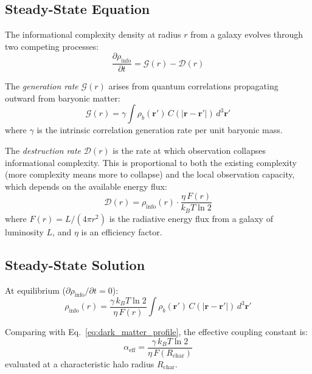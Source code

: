 \documentclass[12pt,a4paper]{article}
\begin{document}
\subsection{Steady-State Equation}

The informational complexity density at radius $r$ from a galaxy evolves through two competing processes:
\begin{equation}
    \frac{\partial \rho_{\mathrm{info}}}{\partial t} = \mathcal{G}(r) - \mathcal{D}(r)
    \label{eq:steadystate}
\end{equation}

The \emph{generation rate} $\mathcal{G}(r)$ arises from quantum correlations propagating outward from baryonic matter:
\begin{equation}
    \mathcal{G}(r) = \gamma \int \rho_b(\mathbf{r}') \, C(|\mathbf{r} - \mathbf{r}'|) \, d^3\mathbf{r}'
\end{equation}
where $\gamma$ is the intrinsic correlation generation rate per unit baryonic mass.

The \emph{destruction rate} $\mathcal{D}(r)$ is the rate at which observation collapses informational complexity. This is proportional to both the existing complexity (more complexity means more to collapse) and the local observation capacity, which depends on the available energy flux:
\begin{equation}
    \mathcal{D}(r) = \rho_{\mathrm{info}}(r) \cdot \frac{\eta \, F(r)}{k_B T \ln 2}
\end{equation}
where $F(r) = L / (4\pi r^2)$ is the radiative energy flux from a galaxy of luminosity $L$, and $\eta$ is an efficiency factor.

\subsection{Steady-State Solution}

At equilibrium ($\partial \rho_{\mathrm{info}} / \partial t = 0$):
\begin{equation}
    \rho_{\mathrm{info}}(r) = \frac{\gamma \, k_B T \ln 2}{\eta \, F(r)} \int \rho_b(\mathbf{r}') \, C(|\mathbf{r} - \mathbf{r}'|) \, d^3\mathbf{r}'
\end{equation}

Comparing with Eq.~\eqref{eq:dark_matter_profile}, the effective coupling constant is:
\begin{equation}
    \alpha_{\mathrm{eff}} = \frac{\gamma \, k_B T \ln 2}{\eta \, F(R_{\mathrm{char}})}
    \label{eq:alpha_eff}
\end{equation}
evaluated at a characteristic halo radius $R_{\mathrm{char}}$.
\end{document}
